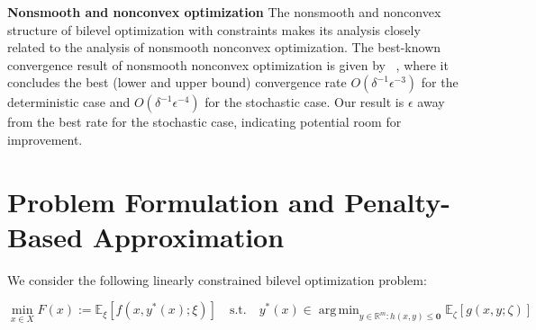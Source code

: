 \documentclass[letterpaper]{article} %
\DeclareMathOperator*{\argmin}{arg\,min}
\newcommand{\1}{\mathbf{1}}
\begin{document}

\textbf{Nonsmooth and nonconvex optimization} 
The nonsmooth and nonconvex structure of bilevel optimization with constraints makes its analysis closely related to the analysis of nonsmooth nonconvex optimization.
The best-known convergence result of nonsmooth nonconvex optimization is given by ~\cite{zhang2020complexity}, where it concludes the best (lower and upper bound) convergence rate $O(\delta^{-1} \epsilon^{-3})$ for the deterministic case and $O(\delta^{-1} \epsilon^{-4})$ for the stochastic case.
Our result is $\epsilon$ away from the best rate for the stochastic case, indicating potential room for improvement.



\section{Problem Formulation and Penalty-Based Approximation}

We consider the following linearly constrained bilevel optimization problem:

\begin{equation}
\min_{x \in X} F(x) := \mathbb{E}_{\xi}\left[ f(x, y^*(x); \xi) \right] \quad \text{s.t.} \quad y^*(x) \in \argmin_{y \in \mathbb{R}^m : h(x, y) \leq \mathbf{0}} \mathbb{E}_{\zeta}\left[ g(x, y; \zeta) \right]
\end{equation}
\end{document}

